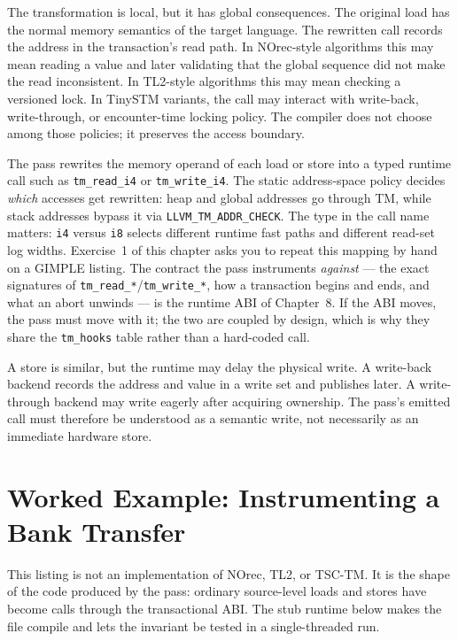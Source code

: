 The transformation is local, but it has global consequences. The original load has the normal memory semantics of the target language. The rewritten call records the address in the transaction's read path. In NOrec-style algorithms this may mean reading a value and later validating that the global sequence did not make the read inconsistent. In TL2-style algorithms this may mean checking a versioned lock. In TinySTM variants, the call may interact with write-back, write-through, or encounter-time locking policy. The compiler does not choose among those policies; it preserves the access boundary.

The pass rewrites the memory operand of each load or store into a typed runtime
call such as \texttt{tm\_read\_i4} or \texttt{tm\_write\_i4}. The static
address-space policy decides \emph{which} accesses get rewritten: heap and global
addresses go through TM, while stack addresses bypass it via
\texttt{LLVM\_TM\_ADDR\_CHECK}. The type in the call name matters: \texttt{i4}
versus \texttt{i8} selects different runtime fast paths and different read-set log
widths. Exercise~1 of this chapter asks you to repeat this mapping by hand on a
GIMPLE listing. The contract the pass instruments \emph{against} --- the exact
signatures of \texttt{tm\_read\_*}\slash{}\texttt{tm\_write\_*}, how a transaction
begins and ends, and what an abort unwinds --- is the runtime ABI of Chapter~8. If
the ABI moves, the pass must move with it; the two are coupled by design, which is
why they share the \texttt{tm\_hooks} table rather than a hard-coded call.

A store is similar, but the runtime may delay the physical write. A write-back backend records the address and value in a write set and publishes later. A write-through backend may write eagerly after acquiring ownership. The pass's emitted call must therefore be understood as a semantic write, not necessarily as an immediate hardware store.

\section{Worked Example: Instrumenting a Bank Transfer}
\label{sec:bank-transfer-instrumented-c}

This listing is not an implementation of NOrec, TL2, or TSC-TM. It is the
shape of the code produced by the pass: ordinary source-level loads and stores
have become calls through the transactional ABI. The stub runtime below makes
the file compile and lets the invariant be tested in a single-threaded run.

